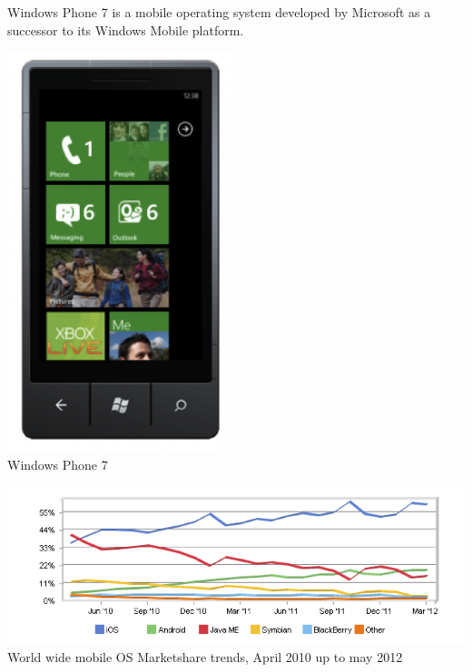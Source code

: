 Windows Phone 7 is a mobile operating system developed by Microsoft as a successor to its Windows Mobile platform.

\begin{centering}
\includegraphics[scale=0.35]{images/WindowsPhone7.png}\\{Windows Phone 7}\\
\end{centering}





\begin{centering}
\includegraphics[scale=0.5]{images/marketsharetrendsApril10Tomay12.png}\\{World wide mobile OS Marketshare trends, April 2010 up to may 2012}\\
\end{centering}

